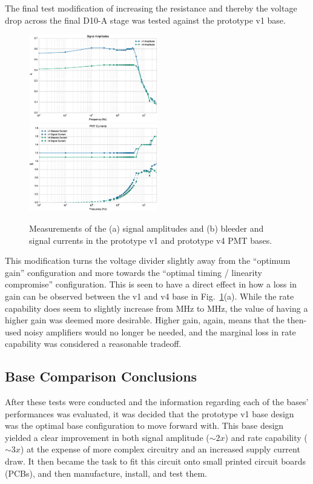 The final test modification of increasing the resistance and thereby the voltage drop across the final D10-A stage was tested against the prototype v1 base.

\begin{figure}[h]
	\centerline{
		\mbox{\includegraphics[width=0.5\textwidth]{figures/Test_v4_Amp.eps} \includegraphics[width=0.5\textwidth]{figures/Test_v4_Current.eps}}}
	\caption{Measurements of the (a) signal amplitudes and (b) bleeder and signal currents in the prototype v1 and prototype v4 PMT bases.}
	\label{fig:test-v4}
\end{figure}

This modification turns the voltage divider slightly away from the ``optimum gain'' configuration and more towards the ``optimal timing / linearity compromise'' configuration. This is seen to have a direct effect in how a loss in gain can be observed between the v1 and v4 base in Fig.~\ref{fig:test-v4}(a). While the rate capability does seem to slightly increase from \unit[4]{MHz} to \unit[5]{MHz}, the value of having a higher gain was deemed more desirable. Higher gain, again, means that the then-used noisy amplifiers would no longer be needed, and the marginal loss in rate capability was considered a reasonable tradeoff.

\subsection{Base Comparison Conclusions}

After these tests were conducted and the information regarding each of the bases' performances was evaluated, it was decided that the prototype v1 base design was the optimal base configuration to move forward with. This base design yielded a clear improvement in both signal amplitude ($\sim2x$) and rate capability ($\sim3x$) at the expense of more complex circuitry and an increased supply current draw. It then became the task to fit this circuit onto small printed circuit boards (PCBs), and then manufacture, install, and test them.

